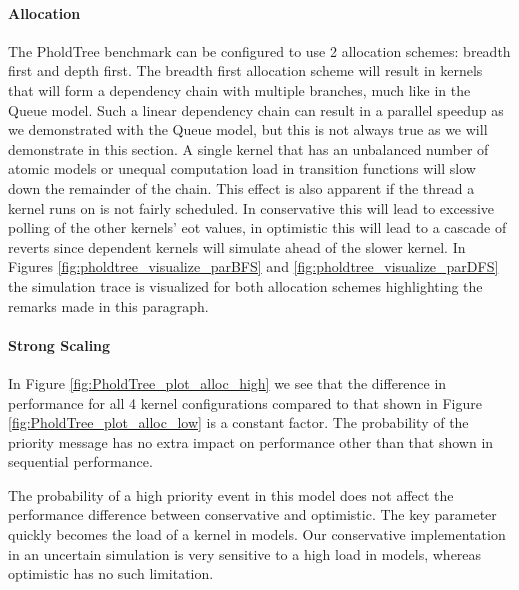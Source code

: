 \paragraph*{Allocation}\label{PholdTreeallocation}
The PholdTree benchmark can be configured to use 2 allocation schemes: breadth first and depth first.
The breadth first allocation scheme will result in kernels that will form a dependency chain with multiple branches, much like in the Queue model.
Such a linear dependency chain can result in a parallel speedup as we demonstrated with the Queue model, but this is not always true as we will demonstrate in this section.
A single kernel that has an unbalanced number of atomic models or unequal computation load in transition functions will slow down the remainder of the chain. This effect is also apparent if the thread a kernel runs on is not fairly scheduled. In conservative this will lead to excessive polling of the other kernels' eot values, in optimistic this will lead to a cascade of reverts since dependent kernels will simulate ahead of the slower kernel. In Figures \ref{fig:pholdtree_visualize_parBFS} and \ref{fig:pholdtree_visualize_parDFS} the simulation trace is visualized for both allocation schemes highlighting the remarks made in this paragraph.
%
%   
%   

\paragraph*{Strong Scaling}\label{pholdtreestrongscale}
In Figure \ref{fig:PholdTree_plot_alloc_high} we see that the difference in performance for all 4 kernel configurations compared to that shown in Figure \ref{fig:PholdTree_plot_alloc_low} is a constant factor. The probability of the priority message has no extra impact on performance other than that shown in sequential performance.

The probability of a high priority event in this model does not affect the performance difference between conservative and optimistic. The key parameter quickly becomes the load of a kernel in models. Our conservative implementation in an uncertain simulation is very sensitive to a high load in models, whereas optimistic has no such limitation.

